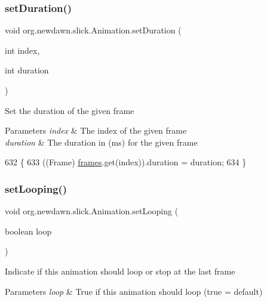 \subsubsection{\texorpdfstring{set\+Duration()}{setDuration()}}
{\footnotesize\ttfamily void org.\+newdawn.\+slick.\+Animation.\+set\+Duration (\begin{DoxyParamCaption}\item[{int}]{index,  }\item[{int}]{duration }\end{DoxyParamCaption})\hspace{0.3cm}{\ttfamily [inline]}}

Set the duration of the given frame


\begin{DoxyParams}{Parameters}
{\em index} & The index of the given frame \\
\hline
{\em duration} & The duration in (ms) for the given frame \\
\hline
\end{DoxyParams}

\begin{DoxyCode}
632                                                      \{
633         ((Frame) \mbox{\hyperlink{classorg_1_1newdawn_1_1slick_1_1_animation_a39f0c6a16e479985b22f7dd3bb781bf7}{frames}}.get(index)).duration = duration;
634     \}
\end{DoxyCode}
\mbox{\label{classorg_1_1newdawn_1_1slick_1_1_animation_a5392a763b0076c488193d9b285069828}} 
\subsubsection{\texorpdfstring{set\+Looping()}{setLooping()}}
{\footnotesize\ttfamily void org.\+newdawn.\+slick.\+Animation.\+set\+Looping (\begin{DoxyParamCaption}\item[{boolean}]{loop }\end{DoxyParamCaption})\hspace{0.3cm}{\ttfamily [inline]}}

Indicate if this animation should loop or stop at the last frame


\begin{DoxyParams}{Parameters}
{\em loop} & True if this animation should loop (true = default) \\
\hline
\end{DoxyParams}

